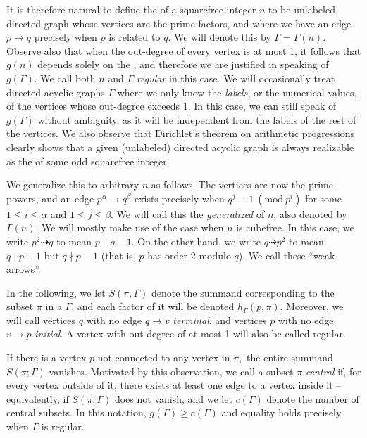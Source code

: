 \documentclass{article}
\newcommand{\Mod}[1]{\ (\mathrm{mod} \ #1)}
\theoremstyle{plain}
\theoremstyle{definition}
\begin{document}
It is therefore natural to define the \emph{} of a squarefree integer $n$ to be unlabeled directed graph whose vertices are the prime factors, and where we have an edge $p \rightarrow q$ precisely when $p$ is related to $q$. We will denote this by $\Gamma = \Gamma(n)$. Observe also that when the out-degree of every vertex is at most 1, it follows that $g(n)$ depends solely on the , and therefore we are justified in speaking of $g(\Gamma).$ We call both $n$ and $\Gamma$ \emph{regular} in this case. We will occasionally treat directed acyclic graphs $\Gamma$ where we only know the \emph{labels}, or the numerical values, of the vertices whose out-degree exceeds $1$. In this case, we can still speak of $g(\Gamma)$ without ambiguity, as it will be independent from the labels of the rest of the vertices. We also observe that Dirichlet's theorem on arithmetic progressions clearly shows that a given (unlabeled) directed acyclic graph is always realizable as the  of some odd squarefree integer.

We generalize this to arbitrary $n$ as follows. The vertices are now the prime powers, and an edge $p^\alpha \rightarrow q^\beta$ exists precisely when $q^j \equiv 1 \Mod{p^i}$ for some $1 \le i \le \alpha$ and $1 \le j \le \beta$. We will call this the \emph{generalized \hg} of $n$, also denoted by $\Gamma(n)$. We will mostly make use of the case when $n$ is cubefree. In this case, we write $p^2 \dashrightarrow q$ to mean $p \parallel q - 1$. On the other hand, we write $q \dashrightarrow p^2$ to mean $q \mid p + 1$ but $q \nmid p - 1$ (that is, $p$ has order $2$ modulo $q$). We call these ``weak arrows''.

In the following, we let $S(\pi, \Gamma)$ denote the summand corresponding to the subset $\pi$ in a  $\Gamma$, and each factor of it will be denoted $h_\Gamma(p, \pi).$ Moreover, we will call vertices $q$ with no edge $q \rightarrow v$ \emph{terminal}, and vertices $p$ with no edge $v \rightarrow p$ \emph{initial}. A vertex with out-degree of at most 1 will also be called regular.

If there is a vertex $p$ not connected to any vertex in $\pi,$ the entire summand $S(\pi; \Gamma)$ vanishes. Motivated by this observation, we call a subset $\pi$ \emph{central} if, for every vertex outside of it, there exists at least one edge to a vertex inside it -- equivalently, if $S(\pi; \Gamma)$ does not vanish, and we let $c(\Gamma)$ denote the number of central subsets. In this notation, $g(\Gamma) \ge c(\Gamma)$ and equality holds precisely when $\Gamma$ is regular.
\end{document}

